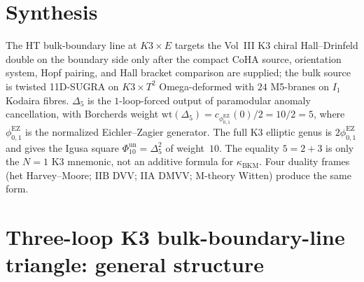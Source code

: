 \section{Synthesis}
\label{sec:htbb-supplement}

\begin{remark}
\label{rem:htbb-K3}
The HT bulk-boundary line at $K3 \times E$ targets the Vol~III K3
chiral Hall--Drinfeld double on the boundary side only after the
compact CoHA source, orientation system, Hopf pairing, and Hall bracket
comparison are supplied; the bulk source is twisted 11D-SUGRA on
$K3 \times T^2$ Omega-deformed with $24$ M5-branes on $I_1$ Kodaira
fibres. $\Delta_5$ is the $1$-loop-forced output of paramodular
anomaly cancellation, with Borcherds weight
$\mathrm{wt}(\Delta_5)=c_{\phi_{0,1}^{\mathrm{EZ}}}(0)/2=10/2=5$,
where $\phi_{0,1}^{\mathrm{EZ}}$ is the normalized Eichler--Zagier
generator. The full K3 elliptic genus is
$2\phi_{0,1}^{\mathrm{EZ}}$ and gives the Igusa square
$\Phi_{10}^{\mathrm{un}}=\Delta_5^2$ of weight~$10$. The equality
$5=2+3$ is only the $N=1$ K3 mnemonic, not an additive formula for
$\kappa_{\mathrm{BKM}}$. Four duality frames (het Harvey--Moore; IIB
DVV; IIA DMVV; M-theory Witten) produce the same form.
\end{remark}

\section{Three-loop K3 bulk-boundary-line triangle: general structure}
\label{sec:htbb-3loop-general}

